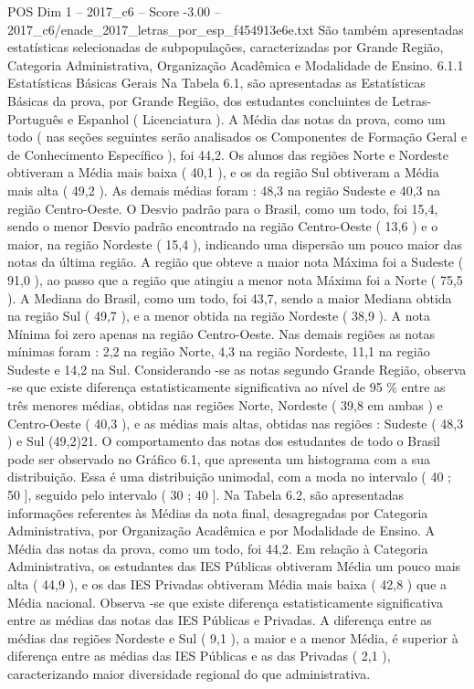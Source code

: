 \begin{textsample}{POS Dim 1 – 2017\_c6 – Score -3.00 – 2017\_c6/enade\_2017\_letras\_por\_esp\_f454913e6e.txt}
São também apresentadas estatísticas selecionadas de subpopulações, caracterizadas por Grande Região, Categoria Administrativa, Organização Acadêmica e Modalidade de Ensino. 6.1.1 Estatísticas Básicas Gerais Na Tabela 6.1, são apresentadas as Estatísticas Básicas da prova, por Grande Região, dos estudantes concluintes de Letras-Português e Espanhol ( Licenciatura ).
A Média das notas da prova, como um todo ( nas seções seguintes serão analisados os Componentes de Formação Geral e de Conhecimento Específico ), foi 44,2.
Os alunos das regiões Norte e Nordeste obtiveram a Média mais baixa ( 40,1 ), e os da região Sul obtiveram a Média mais alta ( 49,2 ).
As demais médias foram : 48,3 na região Sudeste e 40,3 na região Centro-Oeste.
O Desvio padrão para o Brasil, como um todo, foi 15,4, sendo o menor Desvio padrão encontrado na região Centro-Oeste ( 13,6 ) e o maior, na região Nordeste ( 15,4 ), indicando uma dispersão um pouco maior das notas da última região.
A região que obteve a maior nota Máxima foi a Sudeste ( 91,0 ), ao passo que a região que atingiu a menor nota Máxima foi a Norte ( 75,5 ).
A Mediana do Brasil, como um todo, foi 43,7, sendo a maior Mediana obtida na região Sul ( 49,7 ), e a menor obtida na região Nordeste ( 38,9 ).
A nota Mínima foi zero apenas na região Centro-Oeste.
Nas demais regiões as notas mínimas foram : 2,2 na região Norte, 4,3 na região Nordeste, 11,1 na região Sudeste e 14,2 na Sul.
Considerando -se as notas segundo Grande Região, observa -se que existe diferença estatisticamente significativa ao nível de 95 \% entre as três menores médias, obtidas nas regiões Norte, Nordeste ( 39,8 em ambas ) e Centro-Oeste ( 40,3 ), e as médias mais altas, obtidas nas regiões : Sudeste ( 48,3 ) e Sul (49,2)21.
O comportamento das notas dos estudantes de todo o Brasil pode ser observado no Gráfico 6.1, que apresenta um histograma com a sua distribuição.
Essa é uma distribuição unimodal, com a moda no intervalo ( 40 ; 50 ], seguido pelo intervalo ( 30 ; 40 ].
Na Tabela 6.2, são apresentadas informações referentes às Médias da nota final, desagregadas por Categoria Administrativa, por Organização Acadêmica e por Modalidade de Ensino.
A Média das notas da prova, como um todo, foi 44,2.
Em relação à Categoria Administrativa, os estudantes das IES Públicas obtiveram Média um pouco mais alta ( 44,9 ), e os das IES Privadas obtiveram Média mais baixa ( 42,8 ) que a Média nacional.
Observa -se que existe diferença estatisticamente significativa entre as médias das notas das IES Públicas e Privadas.
A diferença entre as médias das regiões Nordeste e Sul ( 9,1 ), a maior e a menor Média, é superior à diferença entre as médias das IES Públicas e as das Privadas ( 2,1 ), caracterizando maior diversidade regional do que administrativa.

\end{textsample}
